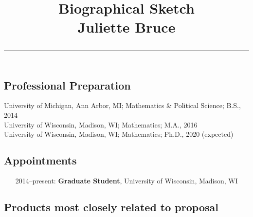 \documentclass[11pt]{article}
\title{%
        \vspace{-2\baselineskip}
            \normalsize
            Biographical Sketch\\
            {\large\textbf{Juliette Bruce }}\\
            \vspace{0.5\baselineskip}
            \hrule
            \vspace{0.5\baselineskip}
        \vspace{-1.5ex}
        }
\date{}
\author{}
\begin{document}
\maketitle
\vspace{-4\baselineskip}

\subsection{Professional Preparation}

    University of Michigan, Ann Arbor, MI;
        Mathematics \& Political Science;
        B.S., 2014
        \\
    University of Wisconsin, Madison, WI;
        Mathematics;
        M.A., 2016
        \\
     University of Wisconsin, Madison, WI;
        Mathematics;
        Ph.D., 2020 (expected)
 
\subsection{Appointments}

\begin{itemize}[label={--9999:},leftmargin=*,itemsep=0pt]
%
    \item[2014--present:]
        \textbf{Graduate Student},
        University of Wisconsin,
        Madison, WI
%
%
%
%
%
%
\end{itemize}

\subsection{Products most closely related to proposal}
\end{document}
